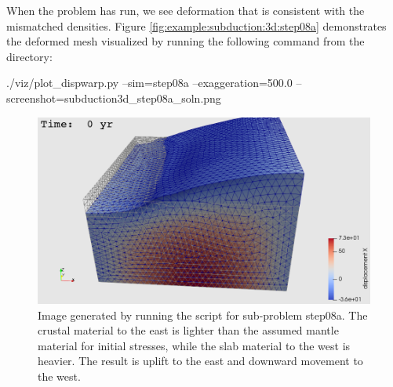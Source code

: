 When the problem has run, we see deformation that is consistent with
the mismatched densities. Figure
\vref{fig:example:subduction:3d:step08a} demonstrates the deformed
mesh visualized by running the following command from the
 directory:
\begin{shell}
./viz/plot_dispwarp.py --sim=step08a --exaggeration=500.0
--screenshot=subduction3d_step08a_soln.png
\end{shell}
\begin{figure}
  \includegraphics[width=4.5in]{examples/figs/subduction3d_step08a_soln}
  \caption{Image generated by running the 
    script for sub-problem step08a. The crustal material to the
    east is lighter than the assumed mantle material for initial
    stresses, while the slab material to the west is heavier. The
    result is uplift to the east and downward movement to the west.}
  \label{fig:example:subduction:3d:step08a}
\end{figure}

